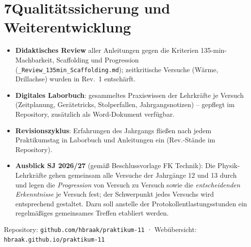 \documentclass[11pt]{scrartcl}
\begin{document}
\section*{7\quad Qualitätssicherung und Weiterentwicklung}
\begin{itemize}
  \item \textbf{Didaktisches Review} aller Anleitungen gegen die Kriterien
        135-min-Machbarkeit, Scaffolding und Progression
        (\texttt{\_Review\_135min\_Scaffolding.md}); zeitkritische Versuche
        (Wärme, Drillachse) wurden in Rev.~1 entschärft.
  \item \textbf{Digitales Laborbuch}: gesammeltes Praxiswissen der Lehrkräfte je
        Versuch (Zeitplanung, Gerätetricks, Stolperfallen, Jahrgangsnotizen) --
        gepflegt im Repository, zusätzlich als Word-Dokument verfügbar.
  \item \textbf{Revisionszyklus}: Erfahrungen des Jahrgangs fließen nach jedem
        Praktikumstag in Laborbuch und Anleitungen ein (Rev.-Stände im Repository).
  \item \textbf{Ausblick SJ 2026/27} (gemäß Beschlussvorlage FK Technik): Die Physik-Lehrkräfte
        gehen gemeinsam alle Versuche der Jahrgänge 12 und 13 durch und legen die
        \emph{Progression} von Versuch zu Versuch sowie die \emph{entscheidenden
        Erkenntnisse} je Versuch fest; der Schwerpunkt jedes Versuchs wird
        entsprechend gestaltet. Dazu soll anstelle der Protokollentlastungsstunden
        ein regelmäßiges gemeinsames Treffen etabliert werden.
\end{itemize}

\vfill
\begin{center}\small
Repository: \texttt{github.com/hbraak/praktikum-11} \quad·\quad
Webübersicht: \texttt{hbraak.github.io/praktikum-11}
\end{center}
\end{document}
